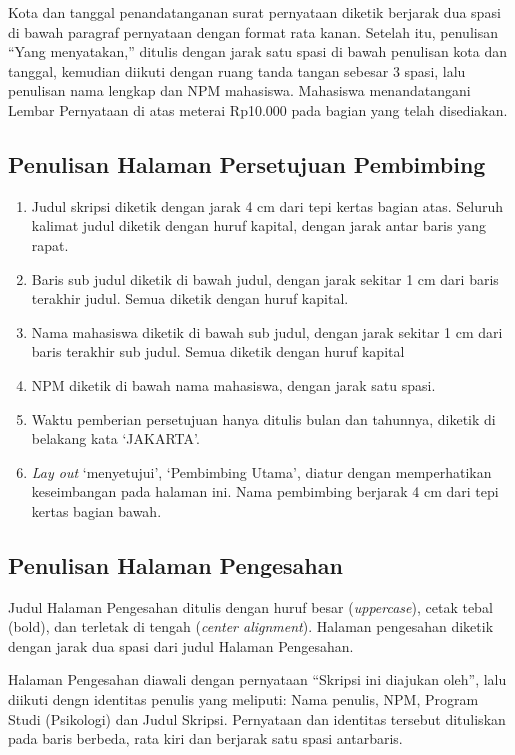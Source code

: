 \documentclass[
  indonesian,
  letterpaper,
]{scrbook}
\providecommand{\tightlist}{%
  \setlength{\itemsep}{0pt}\setlength{\parskip}{0pt}}
\begin{document}
Kota dan tanggal penandatanganan surat pernyataan diketik berjarak dua
spasi di bawah paragraf pernyataan dengan format rata kanan. Setelah
itu, penulisan ``Yang menyatakan,'' ditulis dengan jarak satu spasi di
bawah penulisan kota dan tanggal, kemudian diikuti dengan ruang tanda
tangan sebesar 3 spasi, lalu penulisan nama lengkap dan NPM mahasiswa.
Mahasiswa menandatangani Lembar Pernyataan di atas meterai Rp10.000 pada
bagian yang telah disediakan.

\subsection{Penulisan Halaman Persetujuan
Pembimbing}\label{penulisan-halaman-persetujuan-pembimbing}

\begin{enumerate}
\def\labelenumi{\arabic{enumi}.}
\tightlist
\item
  Judul skripsi diketik dengan jarak 4 cm dari tepi kertas bagian atas.
  Seluruh kalimat judul diketik dengan huruf kapital, dengan jarak antar
  baris yang rapat.
\item
  Baris sub judul diketik di bawah judul, dengan jarak sekitar 1 cm dari
  baris terakhir judul. Semua diketik dengan huruf kapital.
\item
  Nama mahasiswa diketik di bawah sub judul, dengan jarak sekitar 1 cm
  dari baris terakhir sub judul. Semua diketik dengan huruf kapital
\item
  NPM diketik di bawah nama mahasiswa, dengan jarak satu spasi.
\item
  Waktu pemberian persetujuan hanya ditulis bulan dan tahunnya, diketik
  di belakang kata `JAKARTA'.
\item
  \emph{Lay out} `menyetujui', `Pembimbing Utama', diatur dengan
  memperhatikan keseimbangan pada halaman ini. Nama pembimbing berjarak
  4 cm dari tepi kertas bagian bawah.
\end{enumerate}

\subsection{Penulisan Halaman
Pengesahan}\label{penulisan-halaman-pengesahan}

Judul Halaman Pengesahan ditulis dengan huruf besar (\emph{uppercase}),
cetak tebal (bold), dan terletak di tengah (\emph{center alignment}).
Halaman pengesahan diketik dengan jarak dua spasi dari judul Halaman
Pengesahan.

Halaman Pengesahan diawali dengan pernyataan ``Skripsi ini diajukan
oleh'', lalu diikuti dengn identitas penulis yang meliputi: Nama
penulis, NPM, Program Studi (Psikologi) dan Judul Skripsi. Pernyataan
dan identitas tersebut dituliskan pada baris berbeda, rata kiri dan
berjarak satu spasi antarbaris.
\end{document}
